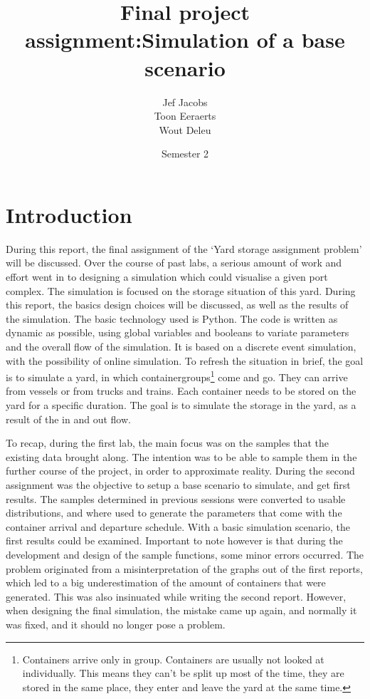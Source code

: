\documentclass{article}
\title{Final project assignment:\@ Simulation of a base scenario }
\author{Jef Jacobs \\ Toon Eeraerts \\ Wout Deleu}
\date{Semester 2}
\begin{document}
\setlength{\parindent}{0pt} \maketitle \tableofcontents \newpage %

\maketitle
\newpage

\section{Introduction}
During this report, the final assignment of the `Yard storage assignment
problem' will be discussed. Over the course of past labs, a serious amount of
work and effort went in to designing a simulation which could visualise a given
port complex. The simulation is focused on the storage situation of this yard.
During this report, the basics design choices will be discussed, as well as the
results of the simulation. The basic technology used is Python. The code is
written as dynamic as possible, using global variables and booleans to variate
parameters and the overall flow of the simulation. It is based on a discrete
event simulation, with the possibility of online simulation. To refresh the
situation in brief, the goal is to simulate a yard, in which
containergroups\footnote{Containers arrive only in group. Containers are
    usually not looked at individually. This means they can’t be split up most of
    the time, they are stored in the same place, they enter and leave the yard at
    the same time.} come and go. They can arrive from vessels or from trucks and
trains. Each container needs to be stored on the yard for a specific duration.
The goal is to simulate the storage in the yard, as a result of the in and out
flow.

To recap, during the first lab, the main focus was on the samples that the
existing data brought along. The intention was to be able to sample them in the
further course of the project, in order to approximate reality. During the
second assignment was the objective to setup a base scenario to simulate, and
get first results. The samples determined in previous sessions were converted
to usable distributions, and where used to generate the parameters that come
with the container arrival and departure schedule. With a basic simulation
scenario, the first results could be examined. Important to note however is
that during the development and design of the sample functions, some minor
errors occurred. The problem originated from a misinterpretation of the graphs
out of the first reports, which led to a big underestimation of the amount of
containers that were generated. This was also insinuated while writing the
second report. However, when designing the final simulation, the mistake came
up again, and normally it was fixed, and it should no longer pose a problem.
\end{document}
